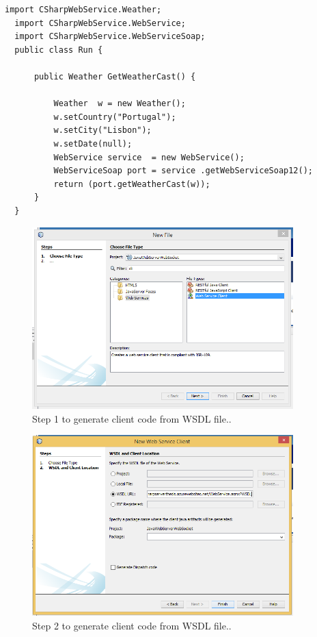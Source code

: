 \begin{lstlisting}[caption=SOAP Web Service Client with Java, label=lst:javaSOAP]
  import CSharpWebService.Weather;
  import CSharpWebService.WebService;
  import CSharpWebService.WebServiceSoap;
  public class Run {

      public Weather GetWeatherCast() {

          Weather  w = new Weather();
          w.setCountry("Portugal");
          w.setCity("Lisbon");
          w.setDate(null);
          WebService service  = new WebService();
          WebServiceSoap port = service .getWebServiceSoap12();
          return (port.getWeatherCast(w));
      }
  }

\end{lstlisting}

\begin{figure}[!htb]
  \centering
  \includegraphics[width=0.9\textwidth]{Figures/client1.png}
  \caption[Step 1 to generate client code from WSDL file.]{Step 1 to generate client code from WSDL file..}
  \label{fig:wsdlstep1}
\end{figure}
\begin{figure}[!htb]
  \centering
  \includegraphics[width=0.9\textwidth]{Figures/client2.png}
  \caption[Step 2 to generate client code from WSDL file.]{Step 2 to generate client code from WSDL file..}
  \label{fig:wsdlstep2}
\end{figure}

